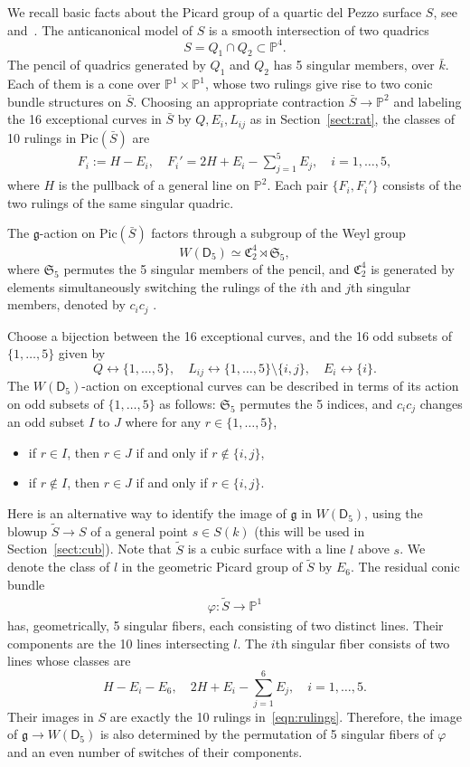 \documentclass[12pt, reqno]{amsart}
\theoremstyle{plain}
\theoremstyle{remark}
\theoremstyle{definition}
\numberwithin{equation}{section}
\def\sD{{\mathsf D}}
\def\fC{{\mathfrak C}}
\def\fS{{\mathfrak S}}
\def\fS{{\mathfrak S}}
\def\bP{{\mathbb P}}
\def\Pic{\mathrm{Pic}}
\begin{document}
We recall basic facts about the Picard group of a quartic del Pezzo surface $S$, see \cite{manin-book} and~\cite{KSS}. The anticanonical model of $S$ is a smooth intersection of two quadrics 
$$
S=Q_1\cap Q_2\subset \bP^4.
$$
The pencil of quadrics generated by $Q_1$ and $Q_2$ has 5 singular members, over $\bar{k}$. Each of them is a cone over $\bP^1\times\bP^1$, whose two rulings give rise to two conic bundle structures on $\bar{S}$. Choosing an appropriate contraction $\bar{S}\to \bP^2$ and labeling the 16 exceptional curves in $\bar{S}$ by $Q, E_i, L_{ij}$ as in Section~\ref{sect:rat},  the classes of 10 rulings in $\Pic(\bar{S})$ are
\begin{align}
    \label{eqn:rulings}
    F_i:=H-E_i,\quad F_i'=2H+E_i-\sum_{j=1}^5E_j,\quad i=1,\ldots,5,
\end{align}
where $H$ is the pullback of a general line on $\bP^2$. Each pair $\{F_i,F_i'\}$ consists of the two rulings of the same singular quadric.

The $\mathfrak g$-action on $\Pic(\bar{S})$ factors through a subgroup of the Weyl group 
$$
W(\sD_5)\simeq \fC_2^4\rtimes\fS_5,
$$
where $\fS_5$ permutes the 5 singular members of the pencil, and $\fC_2^4$ is generated by elements simultaneously switching the rulings of the $i$th and $j$th singular members, denoted by $c_ic_j$ . 

Choose a bijection between the 16 exceptional curves, and the 16 odd subsets of $\{1,\ldots,5\}$ given by
$$
Q\leftrightarrow\{1,\ldots,5\},\quad L_{ij}\leftrightarrow\{1,\ldots,5\}\setminus\{i,j\},\quad E_i\leftrightarrow\{i\}.
$$
The $W(\sD_5)$-action on exceptional curves can be described in terms of its action on odd subsets of $\{1,\ldots,5\}$ as follows: $\fS_5$ permutes the 5 indices, and $c_ic_j$ changes an odd subset $I$ to $J$ where for any $r\in\{1,\ldots,5\}$,
\begin{itemize}
    \item if $r\in I$, then $r\in J$ if and only if $r\notin \{i,j\}$,
    \item if $r\notin I$, then $r\in J$ if and only if $r\in \{i,j\}$.
\end{itemize}

Here is an alternative way to identify the image of $\mathfrak g$ in $W(\sD_5)$, using the blowup $\tilde{S}\to S$ of a general point $s\in S(k)$ (this will be used in Section~\ref{sect:cub}). Note that $\tilde{S}$ is a cubic surface with a line $l$ above $s$. We denote the class of $l$ in the geometric Picard group of $\tilde{S}$
by $E_6$. The residual conic bundle 
\begin{align}
    \label{eqn:cubconicbundle}
    \varphi:\tilde{S}\to\bP^1
\end{align}
has, geometrically, 5 singular fibers, each consisting of two distinct lines. Their components are the 10 lines intersecting $l$. The $i$th singular fiber consists of two lines whose classes are
 $$
 H-E_i-E_6,\quad 2H+E_i-\sum_{j=1}^6E_j,\quad i=1,\ldots,5.
 $$
Their images in $S$ are exactly the 10 rulings in~\eqref{eqn:rulings}. Therefore, the image of $\mathfrak g\to W(\sD_5)$ is also determined by the permutation of 5 singular fibers  of $\varphi$ and an even number of switches of their components.
\end{document}
